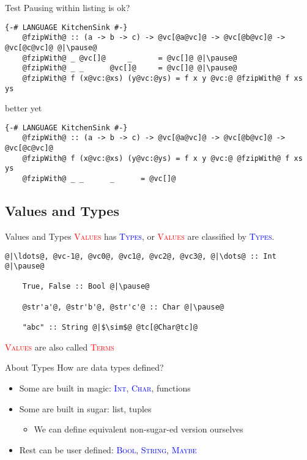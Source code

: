 \documentclass[xcolor={usenames,dvipsnames}]{beamer}
\newcommand{\htycon}[1]{\textcolor{Blue}{\textsc{#1}}}
\newcommand{\hvalcon}[1]{\textcolor{Red}{\textsc{#1}}}
\begin{document}
\begin{frame}[fragile]{Test}
  Pausing within listing is ok?

  \begin{lstlisting}[style=hask]
    {-# LANGUAGE KitchenSink #-}
    @fzipWith@ :: (a -> b -> c) -> @vc[@a@vc]@ -> @vc[@b@vc]@ -> @vc[@c@vc]@ @|\pause@
    @fzipWith@ _ @vc[]@     _      = @vc[]@ @|\pause@
    @fzipWith@ _ _      @vc[]@     = @vc[]@ @|\pause@
    @fzipWith@ f (x@vc:@xs) (y@vc:@ys) = f x y @vc:@ @fzipWith@ f xs ys
  \end{lstlisting}

  better yet

  \begin{lstlisting}[style=hask]
    {-# LANGUAGE KitchenSink #-}
    @fzipWith@ :: (a -> b -> c) -> @vc[@a@vc]@ -> @vc[@b@vc]@ -> @vc[@c@vc]@
    @fzipWith@ f (x@vc:@xs) (y@vc:@ys) = f x y @vc:@ @fzipWith@ f xs ys
    @fzipWith@ _ _      _      = @vc[]@
  \end{lstlisting}
\end{frame}


\subsection{Values and Types}

\begin{frame}[fragile]{Values and Types}
  \hvalcon{Values} has \htycon{Types}, or \hvalcon{Values} are classified by \htycon{Types}.\\

  \begin{lstlisting}[style=hask]
    @|\ldots@, @vc-1@, @vc0@, @vc1@, @vc2@, @vc3@, @|\dots@ :: Int @|\pause@

    True, False :: Bool @|\pause@

    @str'a'@, @str'b'@, @str'c'@ :: Char @|\pause@

    "abc" :: String @|$\sim$@ @tc[@Char@tc]@

  \end{lstlisting}

  \tiny{\hvalcon{Values} are also called \hvalcon{Terms}}
\end{frame}

\begin{frame}[fragile]{About Types}
  How are data types defined?\\
  \pause
  \begin{itemize}
    \item Some are built in magic: \htycon{Int}, \htycon{Char}, functions
    \pause
    \item Some are built in sugar: list, tuples
      \begin{itemize}
        \item We can define equivalent non-sugar-ed version ourselves
      \end{itemize}
    \pause
    \item Rest can be user defined: \htycon{Bool}, \htycon{String}, \htycon{Maybe}
  \end{itemize}
\end{frame}
\end{document}
